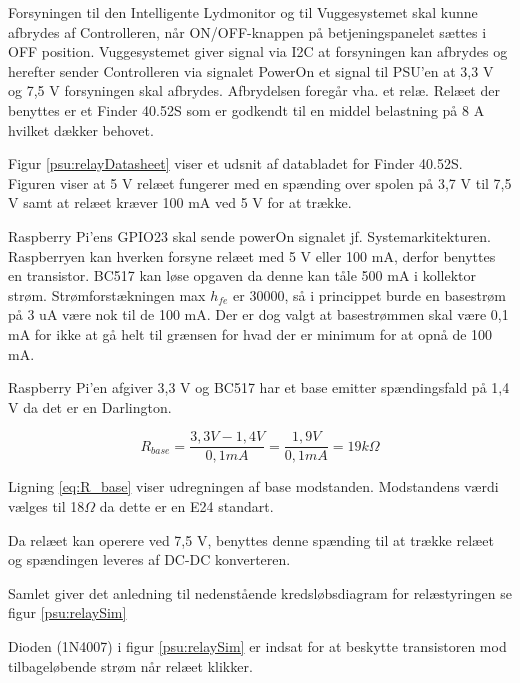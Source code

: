 Forsyningen til den Intelligente Lydmonitor og til Vuggesystemet skal kunne afbrydes af Controlleren, når ON/OFF-knappen på betjeningspanelet sættes i OFF position. Vuggesystemet giver signal via I2C at forsyningen kan afbrydes og herefter sender Controlleren via signalet PowerOn et signal til PSU'en at 3,3 V og 7,5 V forsyningen skal afbrydes. Afbrydelsen foregår vha. et relæ. Relæet der benyttes er et Finder 40.52S som er godkendt til en middel belastning på 8 A hvilket dækker behovet. 


Figur \ref{psu:relayDatasheet} viser et udsnit af databladet for Finder 40.52S. Figuren viser at 5 V relæet fungerer med en spænding over spolen på 3,7 V til 7,5 V samt at relæet kræver 100 mA ved 5 V for at trække.

Raspberry Pi'ens GPIO23 skal sende powerOn signalet jf. Systemarkitekturen. Raspberryen kan hverken forsyne relæet med 5 V eller 100 mA, derfor benyttes en transistor. BC517 kan løse opgaven da denne kan tåle 500 mA i kollektor strøm. Strømforstækningen max $h_{fe}$ er 30000, så i princippet burde en basestrøm på 3 uA være nok til de 100 mA. Der er dog valgt at basestrømmen skal være 0,1 mA for ikke at gå helt til grænsen for hvad der er minimum for at opnå de 100 mA. 

Raspberry Pi'en afgiver 3,3 V og BC517 har et base emitter spændingsfald på 1,4 V da det er en Darlington. 

\begin{equation}
{ R }_{ base }=\frac { 3,3V-1,4V }{ 0,1mA } =\frac { 1,9V }{ 0,1mA } =19k\Omega
\label{eq:R_base}
\end{equation}

Ligning \ref{eq:R_base} viser udregningen af base modstanden. Modstandens værdi vælges til 18$\Omega$ da dette er en E24 standart.  

Da relæet kan operere ved 7,5 V, benyttes denne spænding til at trække relæet og spændingen leveres af DC-DC konverteren. 

Samlet giver det anledning til nedenstående kredsløbsdiagram for relæstyringen se figur \ref{psu:relaySim}


Dioden (1N4007) i figur \ref{psu:relaySim} er indsat for at beskytte transistoren mod tilbageløbende strøm når relæet klikker. 


